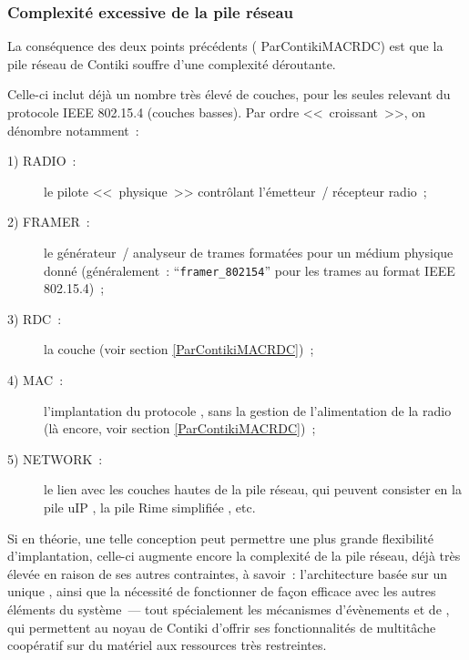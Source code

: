 \subsubsection{Complexité excessive de la pile réseau}
\label{ParContikiPileReseauComplexe}

La conséquence des deux points précédents (
{ParContikiMACRDC}) est que la pile réseau de Contiki souffre
d'une complexité déroutante.

Celle-ci inclut déjà un nombre très élevé de couches, pour les seules
relevant du protocole IEEE 802.15.4 (couches basses). Par ordre
<<~croissant~>>, on dénombre notamment~:

\begin{description}

\item[1) RADIO~:] le pilote <<~physique~>> contrôlant l'émetteur~/
récepteur radio~;

\item[2) FRAMER~:] le générateur~/ analyseur de trames formatées pour un
médium physique donné (généralement~: ``\texttt{framer\_802154}'' pour
les trames au format IEEE 802.15.4)~;

\item[3) RDC~:] la couche  (voir section
\vref{ParContikiMACRDC})~;

\item[4) MAC~:] l'implantation du protocole ,
sans la gestion de l'alimentation de la radio (là encore, voir section
\vref{ParContikiMACRDC})~;

\item[5) NETWORK~:] le lien avec les couches hautes de la pile réseau,
qui peuvent consister en la pile uIP \cite{uip}, la pile Rime simplifiée
\cite{Rime}, etc.

\end{description}

Si en théorie, une telle conception peut permettre une plus grande
flexibilité d'implantation, celle-ci augmente encore la complexité
de la pile réseau, déjà très élevée en raison de ses autres contraintes,
à savoir~: l'architecture basée sur un unique , ainsi
que la nécessité de fonctionner de façon efficace avec les autres éléments
du système~--- tout spécialement les mécanismes d'évènements et de
 \cite{Protothreads}, qui permettent au noyau de
Contiki d'offrir ses fonctionnalités de multitâche coopératif sur du
matériel aux ressources très restreintes.

